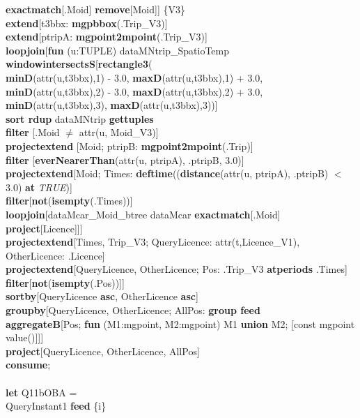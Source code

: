 \documentclass[a4paper]{article}
\newcommand{\op}[1]{\textbf{#1}}
\newcommand{\true}{\textsl{TRUE}}
\begin{document}
\begin{scriptsize}
\begin{tabbing}
\op{exactmatch}[.Moid] \op{remove}[Moid]] \{V3\}\\
\>\>\op{extend}[t3bbx: \op{mgpbbox}(.Trip\_V3)]\\
\>\>\op{extend}[ptripA: \op{mgpoint2mpoint}(.Trip\_V3)]\\
\>\>\op{loopjoin}[\op{fun} (u:TUPLE) dataMNtrip\_SpatioTemp
\op{windowintersectsS}[\op{rectangle3}(\\
\>\>\>\>\op{minD}(attr(u,t3bbx),1) - 3.0, \op{maxD}(attr(u,t3bbx),1) + 3.0,\\
\>\>\>\>\op{minD}(attr(u,t3bbx),2) - 3.0, \op{maxD}(attr(u,t3bbx),2) + 3.0,\\
\>\>\>\>\op{minD}(attr(u,t3bbx),3), \op{maxD}(attr(u,t3bbx),3))]\\
\>\>\>\op{sort rdup} dataMNtrip \op{gettuples}\\
\>\>\>\op{filter} [.Moid $\neq$ attr(u, Moid\_V3)]\\
\>\>\>\op{projectextend} [Moid; ptripB: \op{mgpoint2mpoint}(.Trip)]\\
\>\>\>\op{filter} [\op{everNearerThan}(attr(u, ptripA), .ptripB, 3.0)]\\
\>\>\>\op{projectextend}[Moid; Times: \op{deftime}((\op{distance}(attr(u,
ptripA), .ptripB) $<$ 3.0) \op{at} \true{})]\\
\>\>\>\op{filter}[\op{not}(\op{isempty}(.Times))]\\
\>\>\>\op{loopjoin}[dataMcar\_Moid\_btree dataMcar
\op{exactmatch}[.Moid] \op{project}[Licence]]]\\
\>\>\op{projectextend}[Times, Trip\_V3; QueryLicence: attr(t,Licence\_V1),
OtherLicence: .Licence]\\
\>\>\op{projectextend}[QueryLicence, OtherLicence; Pos: .Trip\_V3
\op{atperiods} .Times]\\
\>\>\op{filter}[\op{not}(\op{isempty}(.Pos))]]\\
\>\op{sortby}[QueryLicence \op{asc}, OtherLicence \op{asc}]\\
\>\op{groupby}[QueryLicence, OtherLicence; AllPos: \op{group feed}\\
\>\>\>\op{aggregateB}[Pos; \op{fun} (M1:mgpoint, M2:mgpoint) M1 \op{union} M2;
[const mgpoint value()]]]\\
\>\op{project}[QueryLicence, OtherLicence, AllPos]\\
\op{consume};\\
\\
\op{let} Q11bOBA =\\
\>QueryInstant1 \op{feed} \{i\}\\

\end{tabbing}
\end{scriptsize}
\end{document}
